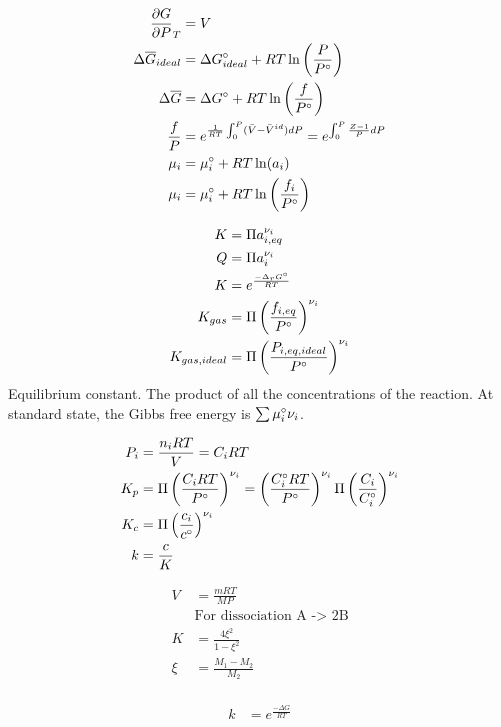 \documentclass[10pt]{article} %
\begin{document}
\begin{align*}
  \frac{\partial G}{\partial P}_T &= V\\
  \Delta \overline{G}_{ideal} &= \Delta G_{ideal}\degree + RT\ln\left(\frac{P}{P\degree}\right)\\
  \Delta \overline{G} &= \Delta G\degree + RT\ln\left(\frac{f}{P\degree}\right)\\
  \frac{f}{P} &= e^{\frac{1}{RT}\int_0^P(\bar{V}-\bar{V}^{id})dP} = e^{\int_0^P\frac{Z-1}{P}dP}\\
  \mu_i &= \mu_i\degree + RT\ln(a_i)\\
  \mu_i &= \mu_i\degree + RT\ln\left(\frac{f_i}{P\degree}\right)\\
\end{align*}

\begin{align*}
  K &= \Pi a_{i,eq}^{\nu_i}\\
  Q &= \Pi a_{i}^{\nu_i}\\
  K &= e^{\frac{-\Delta_r G\degree}{RT}}\\
  K_{gas} &= \Pi\left(\frac{f_{i,eq}}{P\degree}\right)^{\nu_i}\\
  K_{gas,ideal} &= \Pi\left(\frac{P_{i,eq,ideal}}{P\degree}\right)^{\nu_i}\\
\end{align*}
Equilibrium constant. The product of all the concentrations of the reaction. At standard state, the Gibbs free energy is $\sum \mu_i\degree\nu_i$.

\begin{align*}
  P_i &= \frac{n_iRT}{V} = C_iRT\\
  K_p &= \Pi \left(\frac{C_iRT}{P\degree}\right)^{\nu_i} = \left(\frac{C_i\degree RT}{P\degree}\right)^{\nu_i} \Pi \left(\frac{C_i}{C_i\degree}\right)^{\nu_i}\\
  K_c &= \Pi\left(\frac{c_i}{c\degree}\right)^{\nu_i}\\
  k &= \frac{c}{K}\\
\end{align*}

\begin{align*}
  V &= \frac{mRT}{MP}\\
  &\mbox{For dissociation A -> 2B}\\
  K &= \frac{4\xi^2}{1-\xi^2}\\
  \xi &= \frac{M_1-M_2}{M_2}\\
\end{align*}

\begin{align*}
  k &= e^{\frac{-\Delta G}{RT}}\\
\end{align*}
\end{document}
